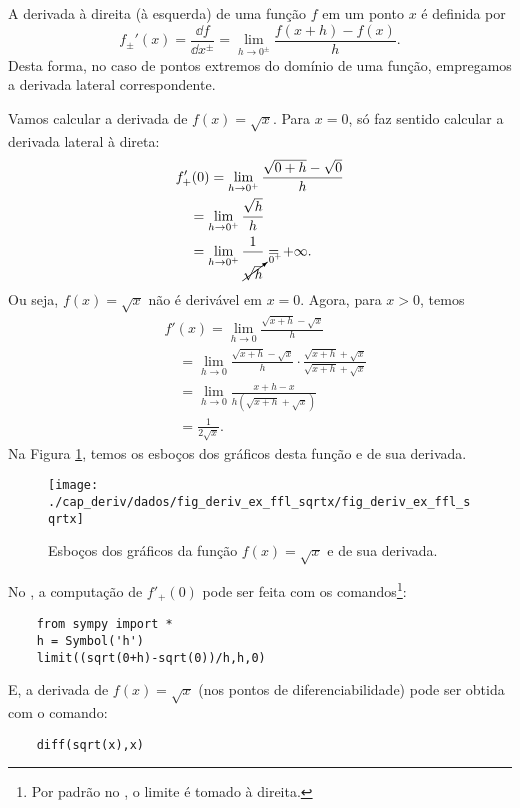 \begin{obs}
  A derivada à direita (à esquerda) de uma função $f$ em um ponto $x$ é definida por
  \begin{equation}
    f_{\pm}'(x) = \frac{\dd f}{\dd x^{\pm}} = \lim_{h\to 0^\pm} \frac{f(x+h)-f(x)}{h}.
  \end{equation}
  Desta forma, no caso de pontos extremos do domínio de uma função, empregamos a derivada lateral correspondente.
\end{obs}

\begin{ex}\label{ex:deriv_sqrtx}
  Vamos calcular a derivada de $f(x) = \sqrt{x}$. Para $x=0$, só faz sentido calcular a derivada lateral à direta:
  \begin{align}
    & f'_{+}(0) = \lim_{h\to 0^+} \frac{\sqrt{0+h}-\sqrt{0}}{h} \\
    & \text{}\quad = \lim_{h\to 0^+} \frac{\sqrt{h}}{h} \\
    & \text{}\quad = \lim_{h\to 0^+} \frac{1}{\cancelto{0^+}{\sqrt{h}}} = +\infty.
  \end{align}
  Ou seja, $f(x) = \sqrt{x}$ não é derivável em $x=0$. Agora, para $x> 0$, temos
  \begin{align}
    & f'(x) = \lim_{h\to 0} \frac{\sqrt{x+h}-\sqrt{x}}{h}\\
    & \text{}\quad = \lim_{h\to 0} \frac{\sqrt{x+h}-\sqrt{x}}{h}\cdot \frac{\sqrt{x+h}+\sqrt{x}}{\sqrt{x+h}+\sqrt{x}}\\
    & \text{}\quad = \lim_{h\to 0} \frac{x+h-x}{h(\sqrt{x+h}+\sqrt{x})}\\
    & \text{}\quad = \frac{1}{2\sqrt{x}}.
  \end{align}
  Na Figura \ref{fig:deriv_ex_ffl_sqrtx}, temos os esboços dos gráficos desta função e de sua derivada.

  \begin{figure}[H]
    \centering
    \texttt{[image: ./cap\_deriv/dados/fig\_deriv\_ex\_ffl\_sqrtx/fig\_deriv\_ex\_ffl\_sqrtx]}
    \caption{Esboços dos gráficos da função $f(x)=\sqrt{x}$ e de sua derivada.}
    \label{fig:deriv_ex_ffl_sqrtx}
  \end{figure}

  \ifispython
  No \sympy, a computação de $f'_{+}(0)$ pode ser feita com os comandos\footnote{Por padrão no \sympy, o limite é tomado à direita.}:
  \begin{lstlisting}
    from sympy import *
    h = Symbol('h')
    limit((sqrt(0+h)-sqrt(0))/h,h,0)
  \end{lstlisting}
  E, a derivada de $f(x) = \sqrt{x}$ (nos pontos de diferenciabilidade) pode ser obtida com o comando:
  \begin{lstlisting}
    diff(sqrt(x),x)
  \end{lstlisting}
  \fi
\end{ex}

